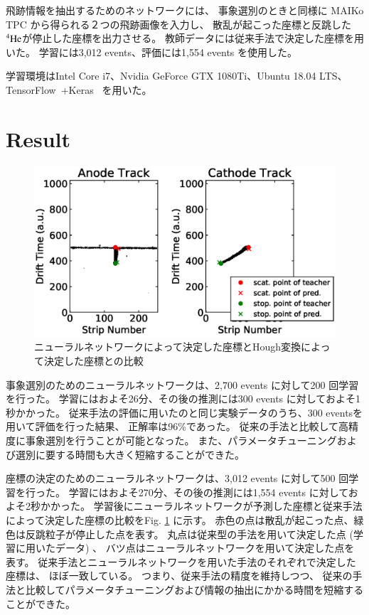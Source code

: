 \documentclass{jps-cp}
\begin{document}
飛跡情報を抽出するためのネットワークには、
事象選別のときと同様に MAIKo TPC から得られる２つの飛跡画像を入力し、
散乱が起こった座標と反跳した${}^{4}\rm{He}$が停止した座標を出力させる。
教師データには従来手法で決定した座標を用いた。
学習には3,012 events、評価には1,554 events を使用した。

学習環境はIntel Core i7、Nvidia GeForce GTX 1080Ti、Ubuntu 18.04 LTS、
TensorFlow~\cite{tensorflow}+Keras~\cite{keras} を用いた。

\section{Result}
\begin{figure}
  \vspace{-4zw}
  \centering
  \includegraphics[clip, width=25zw]{eps/point_detection_compair.eps}
  \caption{ニューラルネットワークによって決定した座標とHough変換によって決定した座標との比較}
  \label{fig:result_detection}
\end{figure}

事象選別のためのニューラルネットワークは、2,700 events に対して200 回学習を行った。
学習にはおよそ26分、その後の推測には300 events に対しておよそ1秒かかった。
従来手法の評価に用いたのと同じ実験データのうち、300 eventsを用いて評価を行った結果、
正解率は96\%であった。
従来の手法と比較して高精度に事象選別を行うことが可能となった。
また、パラメータチューニングおよび選別に要する時間も大きく短縮することができた。

座標の決定のためのニューラルネットワークは、3,012 events に対して500 回学習を行った。
学習にはおよそ270分、その後の推測には1,554 events に対しておよそ2秒かかった。
学習後にニューラルネットワークが予測した座標と従来手法によって決定した座標の比較をFig. \ref{fig:result_detection} に示す。
赤色の点は散乱が起こった点、緑色は反跳粒子が停止した点を表す。
丸点は従来型の手法を用いて決定した点 (学習に用いたデータ) 、
バツ点はニューラルネットワークを用いて決定した点を表す。
従来手法とニューラルネットワークを用いた手法のそれぞれで決定した座標は、
ほぼ一致している。
つまり、従来手法の精度を維持しつつ、
従来の手法と比較してパラメータチューニングおよび情報の抽出にかかる時間を短縮することができた。
\end{document}
